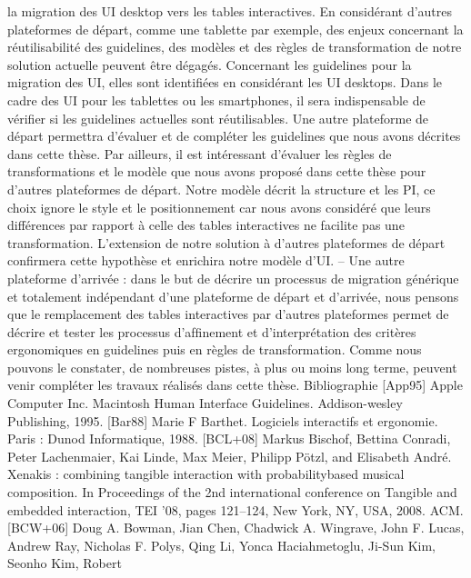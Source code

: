 \documentclass{article}
\begin{document}
la migration des UI desktop vers les tables interactives. En consid\'{e}rant d’autres plateformes de
d\'{e}part, comme une tablette par exemple, des enjeux concernant la r\'{e}utilisabilit\'{e} des guidelines,
des mod\`{e}les et des r\`{e}gles de transformation de notre solution actuelle peuvent \^{e}tre d\'{e}gag\'{e}s.
Concernant les guidelines pour la migration des UI, elles sont identiﬁ\'{e}es en consid\'{e}rant les UI
desktops. Dans le cadre des UI pour les tablettes ou les smartphones, il sera indispensable de
v\'{e}riﬁer si les guidelines actuelles sont r\'{e}utilisables. Une autre plateforme de d\'{e}part permettra
d’\'{e}valuer et de compl\'{e}ter les guidelines que nous avons d\'{e}crites dans cette th\`{e}se.
Par ailleurs, il est int\'{e}ressant d’\'{e}valuer les r\`{e}gles de transformations et le mod\`{e}le que nous
avons propos\'{e} dans cette th\`{e}se pour d’autres plateformes de d\'{e}part. Notre mod\`{e}le d\'{e}crit la
structure et les PI, ce choix ignore le style et le positionnement car nous avons consid\'{e}r\'{e} que
leurs diff\'{e}rences par rapport \`{a} celle des tables interactives ne facilite pas une transformation.
L’extension de notre solution \`{a} d’autres plateformes de d\'{e}part conﬁrmera cette hypoth\`{e}se et
enrichira notre mod\`{e}le d’UI.
– Une autre plateforme d’arriv\'{e}e : dans le but de d\'{e}crire un processus de migration g\'{e}n\'{e}rique
et totalement ind\'{e}pendant d’une plateforme de d\'{e}part et d’arriv\'{e}e, nous pensons que le remplacement des tables interactives par d’autres plateformes permet de d\'{e}crire et tester les processus
d’afﬁnement et d’interpr\'{e}tation des crit\`{e}res ergonomiques en guidelines puis en r\`{e}gles de transformation.
Comme nous pouvons le constater, de nombreuses pistes, \`{a} plus ou moins long terme, peuvent
venir compl\'{e}ter les travaux r\'{e}alis\'{e}s dans cette th\`{e}se.
Bibliographie
[App95]
Apple Computer Inc. Macintosh Human Interface Guidelines. Addison-wesley Publishing, 1995.
[Bar88]
Marie F Barthet. Logiciels interactifs et ergonomie. Paris : Dunod Informatique, 1988.
[BCL+08]
Markus Bischof, Bettina Conradi, Peter Lachenmaier, Kai Linde, Max Meier, Philipp
P\"{o}tzl, and Elisabeth Andr\'{e}. Xenakis : combining tangible interaction with probabilitybased musical composition. In Proceedings of the 2nd international conference on
Tangible and embedded interaction, TEI ’08, pages 121–124, New York, NY, USA,
2008. ACM.
[BCW+06]
Doug A. Bowman, Jian Chen, Chadwick A. Wingrave, John F. Lucas, Andrew Ray,
Nicholas F. Polys, Qing Li, Yonca Haciahmetoglu, Ji-Sun Kim, Seonho Kim, Robert
\end{document}
